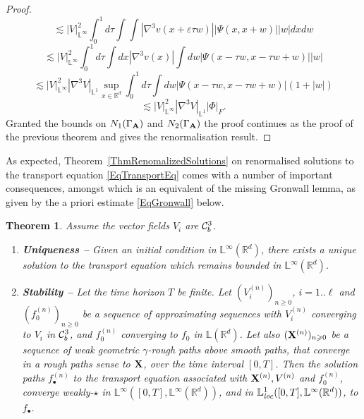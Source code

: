 \documentclass[11pt,a4paper]{amsart}
\newcommand{\RR}{\mathbb{R}}  \newcommand{\CC}{\mathbb{C}}  \newcommand{\LL}{\mathbb{L}}  \newcommand{\WW}{\mathbb{W}}
\renewcommand{\geq}{\geqslant}
\theoremstyle{plain}%
\newtheorem{theorem}{Theorem}
\theoremstyle{definition}
\theoremstyle{remark}
\numberwithin{equation}{section} %
\begin{document}
\begin{proof}
$$
 \lesssim  |V|_{\LL^\infty}^2 \int_0^1 d\tau \int \int |\nabla^3 v(x+\varepsilon \tau w)| |\Psi(x,x+w)| |w| dx dw 
 $$
$$
 \lesssim  |V|_{\LL^\infty}^2 \int_0^1 d\tau \int dx |\nabla^3 v(x)| \int dw  |\Psi(x-\tau w,x-\tau w+w)| |w|
 $$
$$
 \lesssim  |V|_{\LL^\infty}^2 |\nabla^3 V|_{\LL^1} \sup_{x\in\RR^d} \int_0^1 d\tau \int dw  |\Psi(x-\tau w,x-\tau w+w)| (1+|w|)
 $$
$$
 \lesssim  |V|_{\LL^\infty}^2 |\nabla^3 V|_{\LL^1}  |\Phi|_{F}.
 $$
Granted the bounds on $N_1(\Gamma_{\bf A})$ and $N_2(\Gamma_{\bf A})$ the proof continues as the proof of the previous theorem and gives the renormalisation result.
\end{proof}
 
\medskip

As expected, Theorem~\ref{ThmRenomalizedSolutions} on renormalised solutions to the transport equation \eqref{EqTransportEq} comes with a number of important consequences, amongst which is an equivalent of the missing Gronwall lemma, as given by the a priori estimate \eqref{EqGronwall} below.

\begin{theorem}
\label{ThmUniqueness} 
Assume the vector fields $V_i$ are $\mathcal{C}^3_b$. \vspace{0.1cm}
\begin{enumerate}
   \item {\bf Uniqueness --} Given an initial condition in $\LL^\infty(\RR^d)$, there exists a unique solution to the transport equation which remains bounded in $\LL^\infty(\RR^d)$.  \vspace{0.2cm}
   \item {\bf Stability --} Let the time horizon $T$ be finite. Let $(V^{(n)}_i)_{n\geq 0}$, $i=1..\ell$ and $(f^{(n)}_0)_{n\geq 0}$ be a sequence of approximating sequences with $V^{(n)}_i$ converging to $V_i$ in $\mathcal{C}^3_b$, and $f^{(n)}_0$ converging to $f_0$ in $\LL(\RR^d)$. Let also $({\bfX}^{(n)})_{n\geq 0}$ be a sequence of weak geometric $\gamma$-rough paths above smooth paths, that converge in a rough paths sense to ${\bf X}$, over the time interval $[0,T]$. Then the solution paths $f^{(n)}_\bullet$ to the transport equation associated with ${{\bf X}}^{(n)}, V^{(n)}$ and $f^{(n)}_0$, converge weakly-$\star$ in $\LL^\infty([0,T],\LL^\infty(\RR^d))$, and in $\LL^1_\textrm{\emph{loc}}([0,T],\LL^\infty(\RR^d))$, to $f_\bullet$.
\end{enumerate}
\end{theorem}

\medskip
\end{document}
